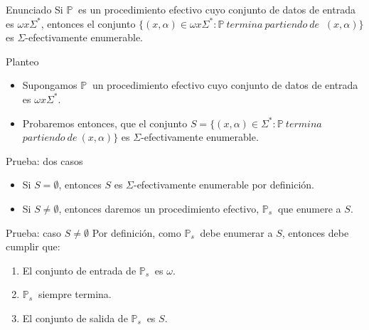 \documentclass[10pt]{beamer}
\newcommand{\p}{\mathbb{P}}
\begin{document}
\begin{frame}{Enunciado}
  \centering
    Si $\p\ $ es un procedimiento efectivo cuyo conjunto de datos de entrada es
    $\omega x \Sigma^{*}$, entonces el conjunto $\{(x, \alpha) \in \omega x \Sigma^{*}: \p\ termina\ partiendo\ de\ $
    $ (x, \alpha)\}$ es $\Sigma$-efectivamente enumerable.

\end{frame}

\begin{frame}{Planteo}
  \begin{itemize}[<+->] \justifying
    \item Supongamos $\p\ $ un procedimiento efectivo cuyo conjunto de datos de
    entrada es $\omega x \Sigma^{*}$.
    \item \centering Probaremos entonces, que el conjunto $S = \{(x, \alpha) \in \Sigma^{*}: \p\ termina\ $
    $partiendo\ de\ (x, \alpha)\}$ es $\Sigma$-efectivamente enumerable.
  \end{itemize}

\end{frame}



\begin{frame}{Prueba: dos casos}
  \begin{itemize}[<+->]\justifying
    \item Si $S = \emptyset$, entonces $S$ es $\Sigma$-efectivamente enumerable por definición.
    \item Si $S \neq \emptyset$, entonces daremos un procedimiento efectivo, $\p_{s}\ $
    que enumere a $S$.
  \end{itemize}

\end{frame}


\begin{frame}{Prueba: caso $S \neq \emptyset$}
  Por definición, como $\p_{s}\ $ debe enumerar a $S$, entonces debe cumplir que:

  \begin{enumerate}[<+->]\justifying
    \item El conjunto de entrada de $\p_{s}\ $ es $\omega$.
    \item $\p_{s}\ $ siempre termina.
    \item El conjunto de salida de $\p_{s}\ $ es $S$.
  \end{enumerate}

\end{frame}
\end{document}
